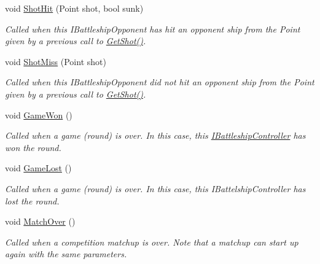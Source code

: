 \begin{DoxyCompactItemize}
void \hyperlink{interface_m_b_c_1_1_core_1_1_i_battleship_controller_a4082a60bb8f9873c9ac794953da6563b}{Shot\-Hit} (Point shot, bool sunk)
\begin{DoxyCompactList}\small\item\em Called when this I\-Battleship\-Opponent has hit an opponent ship from the Point given by a previous call to \hyperlink{interface_m_b_c_1_1_core_1_1_i_battleship_controller_a1e3990b3561cdc6980332b60359d797a}{Get\-Shot()}.\end{DoxyCompactList}\item 
void \hyperlink{interface_m_b_c_1_1_core_1_1_i_battleship_controller_ac0806bdf4ceb486920d78c19a088b507}{Shot\-Miss} (Point shot)
\begin{DoxyCompactList}\small\item\em Called when this I\-Battleship\-Opponent did not hit an opponent ship from the Point given by a previous call to \hyperlink{interface_m_b_c_1_1_core_1_1_i_battleship_controller_a1e3990b3561cdc6980332b60359d797a}{Get\-Shot()}.\end{DoxyCompactList}\item 
\hypertarget{interface_m_b_c_1_1_core_1_1_i_battleship_controller_add0a1ee69c8b1ee623635a6886263841}{void \hyperlink{interface_m_b_c_1_1_core_1_1_i_battleship_controller_add0a1ee69c8b1ee623635a6886263841}{Game\-Won} ()}\label{interface_m_b_c_1_1_core_1_1_i_battleship_controller_add0a1ee69c8b1ee623635a6886263841}

\begin{DoxyCompactList}\small\item\em Called when a game (round) is over. In this case, this \hyperlink{interface_m_b_c_1_1_core_1_1_i_battleship_controller}{I\-Battleship\-Controller} has won the round.\end{DoxyCompactList}\item 
\hypertarget{interface_m_b_c_1_1_core_1_1_i_battleship_controller_a0d0534e190e468cdfb1d7a333dc025d7}{void \hyperlink{interface_m_b_c_1_1_core_1_1_i_battleship_controller_a0d0534e190e468cdfb1d7a333dc025d7}{Game\-Lost} ()}\label{interface_m_b_c_1_1_core_1_1_i_battleship_controller_a0d0534e190e468cdfb1d7a333dc025d7}

\begin{DoxyCompactList}\small\item\em Called when a game (round) is over. In this case, this I\-Battelship\-Controller has lost the round.\end{DoxyCompactList}\item 
\hypertarget{interface_m_b_c_1_1_core_1_1_i_battleship_controller_a35963db7e91bf53b2f9152898659e098}{void \hyperlink{interface_m_b_c_1_1_core_1_1_i_battleship_controller_a35963db7e91bf53b2f9152898659e098}{Match\-Over} ()}\label{interface_m_b_c_1_1_core_1_1_i_battleship_controller_a35963db7e91bf53b2f9152898659e098}

\begin{DoxyCompactList}\small\item\em Called when a competition matchup is over. Note that a matchup can start up again with the same parameters.\end{DoxyCompactList}\end{DoxyCompactItemize}
